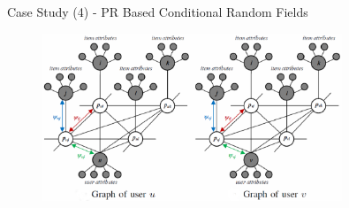 \documentclass[
 size=14pt,
 paper=smartboard,  %
 mode=present, 		%
 display=slides, 	%
 style=tuliplab,  	%
 pauseslide,
 fleqn,leqno]{powerdot}{}
\begin{document}


\begin{slide}[toc=,bm=]{Case Study (4) - PR Based Conditional Random Fields}
	
	\begin{figure}[htbp]
		
		\includegraphics[width=0.8\textwidth]{figures//theme3//Theme3_5_3.eps}
		
	\end{figure}
	
	
	\footnotesize{}
	
\end{slide}

\end{document}
